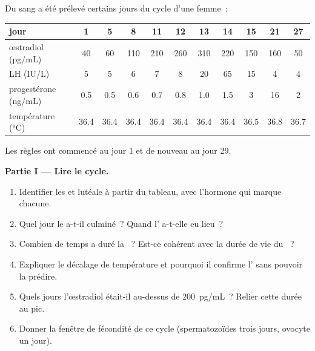 \begin{problem}
\label{pb:b2:reproductive-hormones:1}
Du sang a été prélevé certains jours du cycle d'une femme~:

\begin{center}
\small
\begin{tabular}{lcccccccccc}
\hline
jour & 1 & 5 & 8 & 11 & 12 & 13 & 14 & 15 & 21 & 27 \\
\hline
œstradiol (\unit{pg/mL}) & 40 & 60 & 110 & 210 & 260 & 310 & 220 & 150 & 160 & 50 \\
LH (\unit{IU/L}) & 5 & 5 & 6 & 7 & 8 & 20 & 65 & 15 & 4 & 4 \\
progestérone (\unit{ng/mL}) & 0.5 & 0.5 & 0.6 & 0.7 & 0.8 & 1.0 & 1.5 & 3 & 16 & 2 \\
température (\unit{\celsius}) & 36.4 & 36.4 & 36.4 & 36.4 & 36.4 & 36.4 & 36.4 & 36.5 & 36.8 & 36.7 \\
\hline
\end{tabular}
\end{center}

Les règles ont commencé au jour 1 et de nouveau au jour 29.

\medskip
\noindent\textbf{Partie I --- Lire le cycle.}
\begin{enumerate}
  \item Identifier les  et lutéale à partir du
        tableau, avec l'hormone qui marque chacune.
  \item Quel jour le  a-t-il culminé~? Quand l'
        a-t-elle eu lieu~?
  \item Combien de temps a duré la ~? Est-ce cohérent avec
        la durée de vie du ~?
  \item Expliquer le décalage de température et pourquoi il confirme
        l' sans pouvoir la prédire.
  \item Quels jours l'œstradiol était-il au-dessus de
        \qty{200}{pg/mL}~? Relier cette durée au pic.
  \item Donner la fenêtre de fécondité de ce cycle (spermatozoïdes trois
        jours, ovocyte un jour).
\end{enumerate}


\end{problem}
